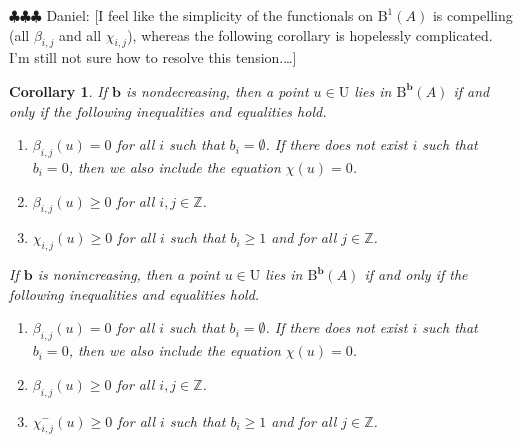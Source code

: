 \documentclass[12pt]{amsart}
\newtheorem{cor}[lemma]{Corollary}
\theoremstyle{definition}
\theoremstyle{remark}
\newcommand{\ZZ}{\mathbb{Z}}
\newcommand{\UU}{\mathrm{U}}
\newcommand{\bb}{\mathbf{b}}
\newcommand{\BBQ}{\mathrm{B}}
\newcommand{\daniel}[1]{{\color{green} \sf $\clubsuit\clubsuit\clubsuit$ Daniel: [#1]}}
\begin{document}
\daniel{I feel like the simplicity of the functionals on $\BBQ^1(A)$ is compelling (all $\beta_{i,j}$ and all $\chi_{i,j}$), whereas the following corollary is hopelessly complicated.  I'm still not sure how to resolve this tension.\dots}
\begin{cor}\label{cor:dualconeA refined}
If $\bb$ is nondecreasing, then a point $u\in \UU$ lies in $\BBQ^{\bb}(A)$ if and only if the following inequalities and equalities hold.
\begin{enumerate}
	\item $\beta_{i,j}(u)=0$ for all $i$ such that $b_i=\emptyset$.  If there does not exist $i$ such that $b_i=0$, then we also include the equation $\chi(u)=0$.
	\item $\beta_{i,j}(u)\geq 0$ for all $i,j\in \ZZ$.
	\item  $\chi_{i,j}(u)\geq 0$ for all $i$ such that $b_i\geq 1$ and for all $j\in \ZZ$.
\end{enumerate}
If $\bb$ is nonincreasing, then a point $u\in \UU$ lies in $\BBQ^{\bb}(A)$ if and only if the following inequalities and equalities hold.
\begin{enumerate}
	\item $\beta_{i,j}(u)=0$ for all $i$ such that $b_i=\emptyset$.  If there does not exist $i$ such that $b_i=0$, then we also include the equation $\chi(u)=0$.
	\item $\beta_{i,j}(u)\geq 0$ for all $i,j\in \ZZ$.
	\item  $\chi^{-}_{i,j}(u)\geq 0$ for all $i$ such that $b_i\geq 1$ and for all $j\in \ZZ$.
\end{enumerate}
\end{cor}
\end{document}
